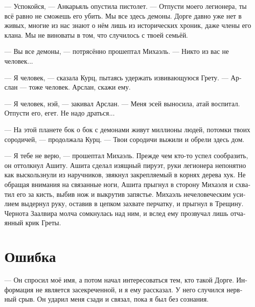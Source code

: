 \documentclass[a4paper,12pt,fleqn]{book}\usepackage{polyglossia}\setdefaultlanguage[babelshorthands=true]{russian}\setotherlanguage{english}\defaultfontfeatures{Ligatures=TeX,Mapping=tex-text}\usepackage{xcolor}\newcommand{\ml}[3]{#2}
\begin{document}
--- Успокойся, --- Анкарьяль опустила пистолет.
\ml{$0$}
{--- Отпусти моего легионера, ты всё равно не сможешь его убить.}
{``Release my leggionaire, you can't kill him anyway.}
\ml{$0$}
{Мы все здесь демоны.}
{We're all daemons here.}
\ml{$0$}
{Дорге давно уже нет в живых, многие из нас знают о нём лишь из исторических хроник, даже члены его клана.}
{Dourgue had gone long ago, most of us know him as but a part of history chronicles, even his kinsmen.}
\ml{$0$}
{Мы не виноваты в том, что случилось с твоей семьёй.}
{We're not responsible for what happened to your family.''}

--- Вы все демоны, --- потрясённо прошептал Михаэль.
\ml{$0$}
{--- Никто из вас не человек...}
{``No one of you is human ...''}

--- Я человек, --- сказала Курц, пытаясь удержать извивающуюся Грету.
\ml{$0$}
{--- Арслан --- тоже человек.}
{``Ary\th{}lan is a human too.}
\ml{$0$}
{Арслан, скажи ему.}
{Ary\th{}lan, tell him.''}

\ml{$0$}
{--- Я человек, нэй, --- закивал Арслан.}
{``I am a human, n\ae{},'' Ary\th{}lan nodded.}
\ml{$0$}
{--- Меня эсей выносила, атай воспитал.}
{``\textit{\OE{}s\ae{}} carried me, \textit{at\ae{}} teached me.}
\ml{$0$}
{Отпусти его, егет.}
{Let him go, \textit{jeget}.}
\ml{$0$}
{Не надо драться...}
{There is no need in fighting ...''}

--- На этой планете бок о бок с демонами живут миллионы людей, потомки твоих сородичей, --- продолжала Курц.
--- Твои сородичи выжили и обрели здесь дом.

\ml{$0$}
{--- Я тебе не верю, --- прошептал Михаэль.}
{``I don't believe you,'' Michael whispered.}
Прежде чем кто-то успел сообразить, он оттолкнул Ашиту.
Ашита сделал изящный пируэт, руки легионера непонятно как выскользнули из наручников, звякнул закрепляемый в корнях дерева хук.
Не обращая внимания на связанные ноги, Ашита прыгнул в сторону Михаэля и схватил его за кисть, выбив нож и выкрутив запястье.
Михаэль нечеловеческим усилием выдернул руку, оставив в цепком захвате перчатку, и прыгнул в Трещину.
Чернота Заалвира молча сомкнулась над ним, и вслед ему прозвучал лишь отчаянный крик Греты.

\section{Ошибка}

--- Он спросил моё имя, а потом начал интересоваться тем, кто такой Дорге.
Информация не является засекреченной, и я ему рассказал.
У него случился нервный срыв.
Он ударил меня сзади и связал, пока я был без сознания.
\end{document}
